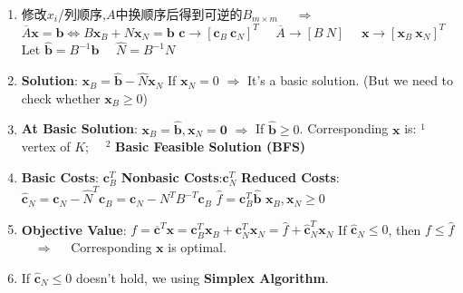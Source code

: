 \documentclass[9pt]{article}
\begin{document}
\begin{enumerate}[itemsep=-2pt, topsep=-2pt]
    \item {\footnotesize 修改$x_i$/列顺序,$A$中换顺序后得到可逆的$B_{m\times m}$ \ \ $\Rightarrow$ \ \ $\overline{A}\mathbf{x}=\mathbf{b}\Leftrightarrow B\mathbf{x}_B+N\mathbf{x}_N=\mathbf{b}$ \quad $\mathbf{c}\rightarrow[\mathbf{c}_B \ \mathbf{c}_N]^T$ \ \ $\overline{A}\rightarrow[B \ N]$ \ \ $\mathbf{x}\to[\mathbf{x}_B \ \mathbf{x}_N]^T$ \quad Let $\widehat{\mathbf{b}}=B^{-1}\mathbf{b}$ \ \ $\widehat{N}=B^{-1}N$}
    \item \textbf{Solution}: $\mathbf{x}_B=\widehat{\mathbf{b}}-\widehat{N}\mathbf{x}_N$ \quad \quad If $\mathbf{x}_N=0$ $\Rightarrow$ It's a basic solution. {\scriptsize (But we need to check whether $\mathbf{x}_B\geq0$)} \quad {}
    \item \textbf{At Basic Solution}: $\mathbf{x}_B=\widehat{\mathbf{b}},\mathbf{x}_N=\mathbf{0}$ \quad $\Rightarrow$ \quad If $\widehat{\mathbf{b}}\geq0$. Corresponding $\mathbf{x}$ is: $^1$ vertex of $K$; \ \ $^2$ \textbf{Basic Feasible Solution (BFS)}
    \item \textbf{Basic Costs}: $\mathbf{c}^T_B$ \quad \textbf{Nonbasic Costs}:$\mathbf{c}^T_N$ \quad \textbf{Reduced Costs}: $\widehat{\mathbf{c}}_N=\mathbf{c}_N -\widehat{N}^T\mathbf{c}_B=\mathbf{c}_N-N^TB^{-T}\mathbf{c}_B$ \quad $\widehat{f}=\mathbf{c}_B^T\widehat{\mathbf{b}}$ \quad \quad $\mathbf{x}_B,\mathbf{x}_N\geq0$
    \item \textbf{Objective Value}: $f=\overline{\mathbf{c}}^T\mathbf{x}=\mathbf{c}^T_B\mathbf{x}_B+\mathbf{c}^T_N\mathbf{x}_N=\widehat{f}+\widehat{\mathbf{c}}_N^T\mathbf{x}_N$ \quad \quad If $\widehat{\mathbf{c}}_N\leq0$, then $f\leq\widehat{f}$ \ \ $\Rightarrow$ \ \ Corresponding $\mathbf{x}$ is optimal.
    \item If $\widehat{\mathbf{c}}_N\leq0$ doesn't hold, we using \textbf{Simplex Algorithm}.
\end{enumerate}
\end{document}
